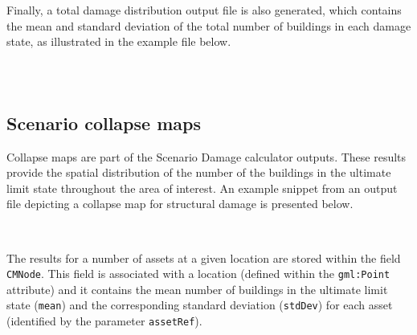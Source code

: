 Finally, a total damage distribution output file is also generated, which contains
the mean and standard deviation of the total number of buildings in each
damage state, as illustrated in the example file below.

\inputminted[firstline=1,firstnumber=1,fontsize=\footnotesize,frame=single,linenos,bgcolor=lightgray]{xml}{oqum/risk/verbatim/output_scenario_damage_total.xml}\\


\subsection{Scenario collapse maps}
\label{subsec:scenario_collapse_map}

Collapse maps are part of the Scenario Damage calculator outputs. These
results provide the spatial distribution of the number of the buildings in the
ultimate limit state throughout the area of interest. An example snippet from
an output file depicting a collapse map for structural damage is presented
below.

\inputminted[firstline=1,firstnumber=1,fontsize=\footnotesize,frame=single,bgcolor=lightgray]{xml}{oqum/risk/verbatim/output_scenario_damage_collapse.xml}\\

The results for a number of \glspl{asset} at a given location are stored
within the field \Verb+CMNode+. This field is associated with a location
(defined within the \Verb+gml:Point+ attribute) and it contains the mean
number of buildings in the ultimate limit state (\Verb+mean+) and the
corresponding standard deviation (\Verb+stdDev+) for each \gls{asset}
(identified by the parameter \Verb+assetRef+).
